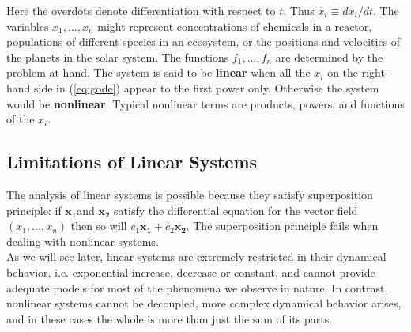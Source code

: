 Here the overdots denote differentiation with respect to $t$.
Thus $\dot{x_i}\equiv dx_i/dt$.
The variables $x_1,\ldots, x_n$ might represent concentrations of chemicals in a reactor, populations of different species in an ecosystem, or the positions and velocities of the planets in the solar system.
The functions $f_1,\ldots, f_n$ are determined by the problem at hand.
The system is said to be {\textbf{linear}} when all the $x_i$ on the right-hand side in (\ref{eq:gode}) appear to the first power only.
Otherwise the system would be {\textbf{nonlinear}}.
Typical nonlinear terms are products, powers, and functions of the $x_i$.
\subsection{Limitations of Linear Systems}
The analysis of linear systems is possible because they satisfy superposition principle: if $\mathbf{x_1}$and $\mathbf{x_2}$ satisfy the differential equation for the vector field $(x_1,\ldots, x_n)$ then so will $c_1\mathbf{x_1}+c_2\mathbf{x_2}$.
The superposition principle fails when dealing with nonlinear systems.\\
As we will see later, linear systems are extremely restricted in their dynamical behavior, i.e. exponential increase, decrease or constant, and cannot provide adequate models for most of the phenomena we observe in nature.
In contrast, nonlinear systems cannot be decoupled, more complex dynamical behavior arises, and in these cases the whole is more than just the sum of its parts.